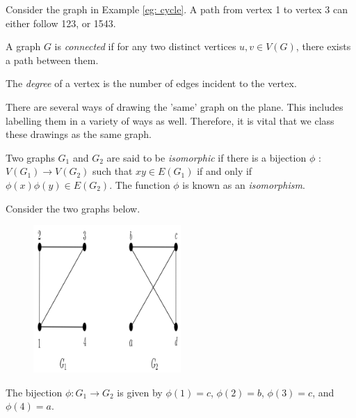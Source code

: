 \begin{example}
Consider the graph in Example \ref{eg: cycle}. A path from vertex 1 to vertex 3 can either follow 123, or 1543.
\end{example}

\begin{definition}
A graph $G$ is \textit{connected} if for any two distinct vertices $u,v \in V(G)$, there exists a path between them.
\end{definition}

\begin{definition}
The \textit{degree} of a vertex is the number of edges incident to the vertex.
\end{definition}

\begin{flushleft}
There are several ways of drawing the 'same' graph on the plane. This includes labelling them in a variety of ways as well. Therefore, it is vital that we class these drawings as the same graph.
\end{flushleft}

\begin{definition}
\label{def: isomorphism}
Two graphs $G_1$ and $G_2$ are said to be \textit{isomorphic} if there is a bijection $\phi$ : $V(G_1) \rightarrow V(G_2)$ such that $xy \in E(G_1)$ if and only if $\phi(x)\phi(y) \in E(G_2)$. The function $\phi$ is known as an \textit{isomorphism}.
\end{definition}

\begin{example}
\label{eg: isomorphic graphs}
Consider the two graphs below.

\begin{figure}[ht]
    \centering
    \includegraphics[width = 0.5\textwidth]{Chapter 2/3. isomorphic graphs .png}
    \label{fig:isomoprhic graphs}
\end{figure}
\vspace{-5 mm}
\begin{flushleft}
The bijection $\phi : G_1 \rightarrow G_2$ is given by $\phi(1) = c$, $\phi(2) = b$, $\phi(3) = c$, and $\phi(4) = a$.    
\end{flushleft}
\end{example}

